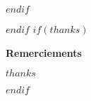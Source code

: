 \begin{titlepage}
$endif$

        
  
        
        
        










$endif$
$if(thanks)$
\vspace{2.5cm}
\begin{minipage}[b]{40em}
  \textcolor{scporouge}{
    \textbf{Remerciements}}{

      \vspace{0.2cm}
      \vspace{0.2cm}
    
    \textit{\small{$thanks$}} 
  }
\end{minipage}
$endif$
\end{titlepage}